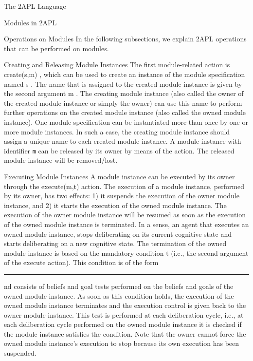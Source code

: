 \begin{chapter}{The 2APL Language}
\begin{section}{Modules in 2APL}
\begin{subsection}{Operations on Modules}
In the following subsections, we explain 2APL operations that can be
performed on modules.

\begin{subsubsection}{Creating and Releasing Module Instances}
The first module-related action is \ttt create(s,m) \ttt, which can
be used to create an instance of the module specification named \ttt
s \ttt. The name that is assigned to the created module instance is
given by the second argument \ttt m \ttt. The creating module
instance (also called the owner of the created module instance or
simply the owner) can use this name to perform further operations on
the created module instance (also called the owned module instance).
One module specification can be instantiated more than once by one
or more module instances. In such a case, the creating module
instance should assign a unique name to each created module
instance. A module instance with identifier {\tt m} can be released
by its owner by means of the  action. The released
module instance  will be removed/lost.
\end{subsubsection}


\begin{subsubsection}{Executing Module Instances}
A module instance  can be executed by its owner through the
\ttt execute(m,t) \ttt action. The execution of a module instance,
performed by its owner, has two effects: 1) it suspends the
execution of the owner module instance, and 2) it starts the
execution of the owned module instance. The execution of the owner
module instance will be resumed as soon as the execution of the
owned module instance is terminated. In a sense, an agent that
executes an owned module instance, stops deliberating on its current
cognitive state and starts deliberating on a new cognitive state.
The termination of the owned module instance is based on the
mandatory condition \ttt t \ttt (i.e., the second argument of the
execute action). This condition is of the form \rule{test} and
consists of beliefs and goal tests performed on the beliefs and
goals of the owned module instance. As soon as this condition holds,
the execution of the owned module instance terminates and the
execution control is given back to the owner module instance. This
test is performed at each deliberation cycle, i.e., at each
deliberation cycle performed on the owned module instance it is
checked if the module instance satisfies the condition. Note that
the owner cannot force the owned module instance's execution to stop
because its own execution has been suspended.
\end{subsubsection}


\end{subsection}
\end{section}
\end{chapter}
